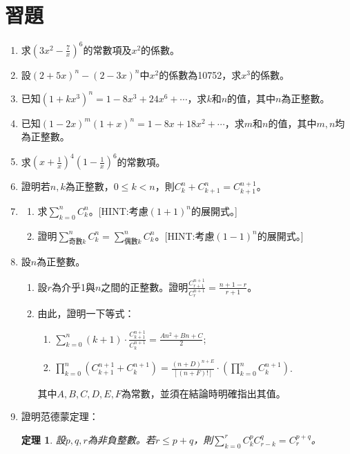 \documentclass[12pt]{article}
\newtheorem*{theorem}{定理}
\begin{document}
    \section*{習題}
    \begin{enumerate}
        \item 求$(3x^2-\frac{7}{x})^6$的常數項及$x^2$的係數。
        \item 設$(2+5x)^n-(2-3x)^n$中$x^2$的係數為10752，求$x^3$的係數。
        \item 已知$(1+kx^3)^n=1-8x^3+24x^6+\cdots$，求$k$和$n$的值，其中$n$為正整數。
        \item 已知$(1-2x)^m(1+x)^n=1-8x+18x^2+\cdots$，求$m$和$n$的值，其中$m,n$均為正整數。
        \item 求$(x+\frac{1}{x})^4(1-\frac{1}{x})^6$的常數項。
        \item 證明若$n,k$為正整數，$0\leq k< n$，則$C_k^n+C_{k+1}^n=C_{k+1}^{n+1}$。
        \item \begin{enumerate}
            \item 求$\sum_{k=0}^n C_k^n$。[HINT:考慮$(1+1)^n$的展開式。]
            \item 證明$\sum_{\textrm{奇數}k}^n C_k^n=\sum_{\textrm{偶數}k}^n C_k^n$。[HINT:考慮$(1-1)^n$的展開式。]
        \end{enumerate}
        \item 設$n$為正整數。\begin{enumerate}
            \item 設$r$為介乎1與$n$之間的正整數。證明$\frac{C_{r+1}^{n+1}}{C_r^{n+1}}=\frac{n+1-r}{r+1}$。
            \item 由此，證明一下等式：\begin{enumerate}
                \item $\displaystyle \sum_{k=0}^{n}(k+1)\cdot\frac{C_{k+1}^{n+1}}{C_k^{n+1}}=\frac{An^2+Bn+C}{2}$;
                \item $\displaystyle \prod_{k=0}^{n}(C_{k+1}^{n+1}+C_{k}^{n+1})=\frac{(n+D)^{n+E}}{[(n+F)!]}\cdot (\prod_{k=0}^{n}C_k^{n+1})$.
            \end{enumerate}
            其中$A,B,C,D,E,F$為常數，並須在結論時明確指出其值。
        \end{enumerate}
        \item 證明范德蒙定理：\begin{theorem}
            設$p,q,r$為非負整數。若$r\leq p+q$，則$\sum_{k=0}^{r}C_k^p C_{r-k}^q=C_r^{p+q}$。
        \end{theorem}

\end{enumerate}
\end{document}
